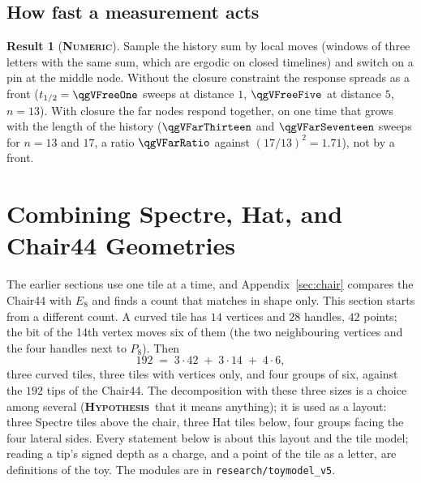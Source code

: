\documentclass[11pt]{article}
\newcommand{\numeric}{\textbf{\textsc{Numeric}}}
\newcommand{\hypo}{\textbf{\textsc{Hypothesis}}}
\theoremstyle{definition}
\newtheorem{result}{Result}
\begin{document}
\subsection{How fast a measurement acts}\label{sec:second-relax}
\begin{result}[\numeric]\label{res:relax}
Sample the history sum by local moves (windows of three letters with the same sum, which are ergodic on closed timelines) and switch on a pin at the middle node. Without the closure constraint the response spreads as a front ($t_{1/2}=\qgVFreeOne$ sweeps at distance $1$, $\qgVFreeFive$ at distance $5$, $n=13$). With closure the far nodes respond together, on one time that grows with the length of the history ($\qgVFarThirteen$ and $\qgVFarSeventeen$ sweeps for $n=13$ and $17$, a ratio $\qgVFarRatio$ against $(17/13)^2=1.71$), not by a front.
\end{result}


\section{Combining Spectre, Hat, and Chair44 Geometries}
\label{sec:third}
The earlier sections use one tile at a time, and Appendix~\ref{sec:chair} compares the Chair44 with $E_8$ and finds a count that matches in shape only. This section starts from a different count. A curved tile has $14$ vertices and $28$ handles, $42$ points; the bit of the 14th vertex moves six of them (the two neighbouring vertices and the four handles next to $P_8$). Then
\[ 192 \;=\; 3\cdot 42 \;+\; 3\cdot 14 \;+\; 4\cdot 6 , \]
three curved tiles, three tiles with vertices only, and four groups of six, against the $192$ tips of the Chair44. The decomposition with these three sizes is a choice among several (\hypo\ that it means anything); it is used as a layout: three Spectre tiles above the chair, three Hat tiles below, four groups facing the four lateral sides. Every statement below is about this layout and the tile model; reading a tip's signed depth as a charge, and a point of the tile as a letter, are definitions of the toy. The modules are in \texttt{research/toymodel\_v5}.
\end{document}
